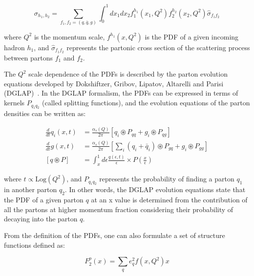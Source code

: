 \begin{equation}
\sigma_{h_{1},h_{2}} = \sum_{f_{1},f_{2}=(q,\bar{q},g)}\int_{0}^{1}dx_{1}dx_{2}f_{1}^{h_{1}}\left(x_{1},Q^{2}\right)f_{2}^{h_{2}}\left(x_{2},Q^{2}\right)\hat{\sigma}_{f_{1}f_{2}}
\label{eq:FactTheorem}
\end{equation}

where $Q^{2}$ is the momentum scale, $f^{h_{1}}\left(x,Q^{2}\right)$ is the PDF of a given incoming hadron $h_{1}$, and $\hat{\sigma}_{f_{1}f_{2}}$ represents the partonic cross section of the scattering process between partons $f_{1}$ and $f_{2}$.

The $Q^{2}$ scale dependence of the PDFs is described by the parton evolution equations developed by Dokshiftzer, Gribov, Lipatov, Altarelli and Parisi (DGLAP)~\cite{DGLAP_1,DGLAP_2,DGLAP_3}. In the DGLAP formalism, the PDFs can be expressed in terms of kernels $P_{q_{1}q_{2}}$ (called splitting functions), and the evolution equations of the parton densities can be written as:

\begin{equation}
  \begin{alignedat}{1}
    \frac{d}{dt}q_{i}\left(x,t\right) &= \frac{\alpha_{s}\left(Q\right)}{2\pi}\left[q_{i}\circledast{P_{qq}} + g_{i}\circledast{P_{qg}}\right] \\
    \frac{d}{dt}g\left(x,t\right) &= \frac{\alpha_{s}\left(Q\right)}{2\pi}\left[\sum_{i}\left(q_{i}+\bar{q}_{i}\right)\circledast{P_{gq}} + g_{i}\circledast{P_{gg}}\right] \\
    \left[q\circledast{P}\right] &= \int_{x}^{1}d\epsilon\frac{q\left(\epsilon,t\right)}{\epsilon}\times{P\left(\frac{x}{\epsilon}\right)}
  \end{alignedat}
  \label{eq:DGLAP}
\end{equation}

where $t \propto \mathrm{Log}\left(Q^{2}\right)$, and $P_{q_{1}q_{2}}$ represents the probability of finding a parton $q_{1}$ in another parton $q_{2}$. In other words, the DGLAP evolution equations state that the PDF of a given parton $q$ at an x value is determined from the contribution of all the partons at higher momentum fraction considering their probability of decaying into the parton $q$.

From the definition of the PDFs, one can also formulate a set of structure functions defined as:

\begin{equation}
F^{p}_{2}\left(x\right) = \sum_{q}e_{q}^{2}f\left(x,Q^{2}\right)x
\end{equation}

